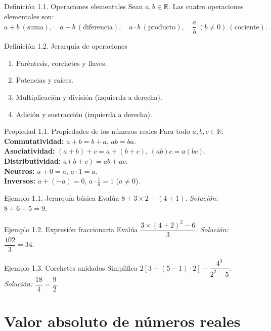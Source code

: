 \documentclass[12pt,letterpaper]{book}
\begin{document}
\begin{defbox}{Definición 1.1. Operaciones elementales}
Sean $a,b\in\mathbb{R}$. Las cuatro operaciones elementales son:
\[ a+b\ (\text{suma}),\quad a-b\ (\text{diferencia}),\quad a\cdot b\ (\text{producto}),\quad \frac{a}{b}\ (b\neq0)\ (\text{cociente}). \]
\end{defbox}

\begin{defbox}{Definición 1.2. Jerarquía de operaciones}
\begin{enumerate}
\item Paréntesis, corchetes y llaves.
\item Potencias y raíces.
\item Multiplicación y división (izquierda a derecha).
\item Adición y sustracción (izquierda a derecha).
\end{enumerate}
\end{defbox}

\begin{propbox}{Propiedad 1.1. Propiedades de los números reales}
Para todo $a,b,c\in\mathbb{R}$:\\
\textbf{Conmutatividad:} $a+b=b+a$, $ab=ba$.\\
\textbf{Asociatividad:} $(a+b)+c=a+(b+c)$, $(ab)c=a(bc)$.\\
\textbf{Distributividad:} $a(b+c)=ab+ac$.\\
\textbf{Neutros:} $a+0=a$, $a\cdot1=a$.\\
\textbf{Inversos:} $a+(-a)=0$, $a\cdot\frac{1}{a}=1$ ($a\neq0$).
\end{propbox}

\begin{ejbox}{Ejemplo 1.1. Jerarquía básica}
Evalúa $8+3\times2-(4+1)$. \textit{Solución:} $8+6-5=9$.
\end{ejbox}

\begin{ejbox}{Ejemplo 1.2. Expresión fraccionaria}
Evalúa $\dfrac{3\times(4+2)^2-6}{3}$. \textit{Solución:} $\dfrac{102}{3}=34$.
\end{ejbox}

\begin{ejbox}{Ejemplo 1.3. Corchetes anidados}
Simplifica $2[3+(5-1)\cdot2]-\dfrac{4^3}{2^2-5}$. \textit{Solución:} $\dfrac{18}{4}=\dfrac{9}{2}$.
\end{ejbox}

\section{Valor absoluto de números reales}
\end{document}
